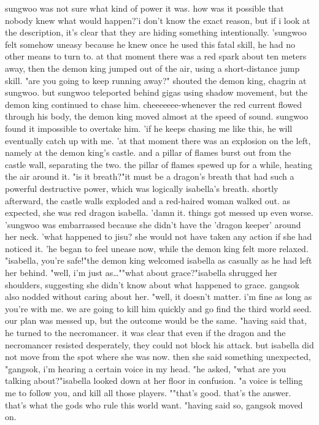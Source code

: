 sungwoo was not sure what kind of power it was.
 how was it possible that nobody knew what would happen?'i don't know the exact reason, but if i look at the description, it's clear that they are hiding something intentionally.
'sungwoo felt somehow uneasy because he knew once he used this fatal skill, he had no other means to turn to.
at that moment there was a red spark about ten meters away, then the demon king jumped out of the air, using a short-distance jump skill.
"are you going to keep running away?" shouted the demon king, chagrin at sungwoo.
but sungwoo teleported behind gigas using shadow movement, but the demon king continued to chase him.
 cheeeeeee-whenever the red current flowed through his body, the demon king moved almost at the speed of sound.
 sungwoo found it impossible to overtake him.
 'if he keeps chasing me like this, he will eventually catch up with me.
'at that moment there was an explosion on the left, namely at the demon king's castle.
 and a pillar of flames burst out from the castle wall, separating the two.
the pillar of flames spewed up for a while, heating the air around it.
"is it breath?"it must be a dragon's breath that had such a powerful destructive power, which was logically isabella's breath.
shortly afterward, the castle walls exploded and a red-haired woman walked out.
as expected, she was red dragon isabella.
'damn it.
 things got messed up even worse.
'sungwoo was embarrassed because she didn't have the 'dragon keeper' around her neck.
'what happened to jisu? she would not have taken any action if she had noticed it.
'he began to feel unease now, while the demon king felt more relaxed.
"isabella, you're safe!"the demon king welcomed isabella as casually as he had left her behind.
"well, i'm just as…""what about grace?"isabella shrugged her shoulders, suggesting she didn't know about what happened to grace.
 gangsok also nodded without caring about her.
"well, it doesn't matter.
 i'm fine as long as you're with me.
 we are going to kill him quickly and go find the third world seed.
 our plan was messed up, but the outcome would be the same.
"having said that, he turned to the necromancer.
it was clear that even if the dragon and the necromancer resisted desperately, they could not block his attack.
but isabella did not move from the spot where she was now.
then she said something unexpected, "gangsok, i'm hearing a certain voice in my head.
"he asked, "what are you talking about?"isabella looked down at her floor in confusion.
"a voice is telling me to follow you, and kill all those players.
""that's good.
 that's the answer.
 that's what the gods who rule this world want.
"having said so, gangsok moved on.


